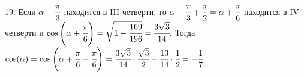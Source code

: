 19. Если $\alpha-\cfrac{\pi}{3}$ находится в III четверти, то $\alpha-\cfrac{\pi}{3}+\cfrac{\pi}{2}=\alpha+\cfrac{\pi}{6}$ находится в IV четверти и $\cos\left(\alpha+\cfrac{\pi}{6}\right)=\sqrt{1-\cfrac{169}{196}}=\cfrac{3\sqrt{3}}{14}.$ Тогда $\cos(\alpha)=\cos\left(\alpha+\cfrac{\pi}{6}-\cfrac{\pi}{6}\right)=
\cfrac{3\sqrt{3}}{14}\cdot\cfrac{\sqrt{3}}{2}-\cfrac{13}{14}\cdot\cfrac{1}{2}=-\cfrac{1}{7}.$\\
